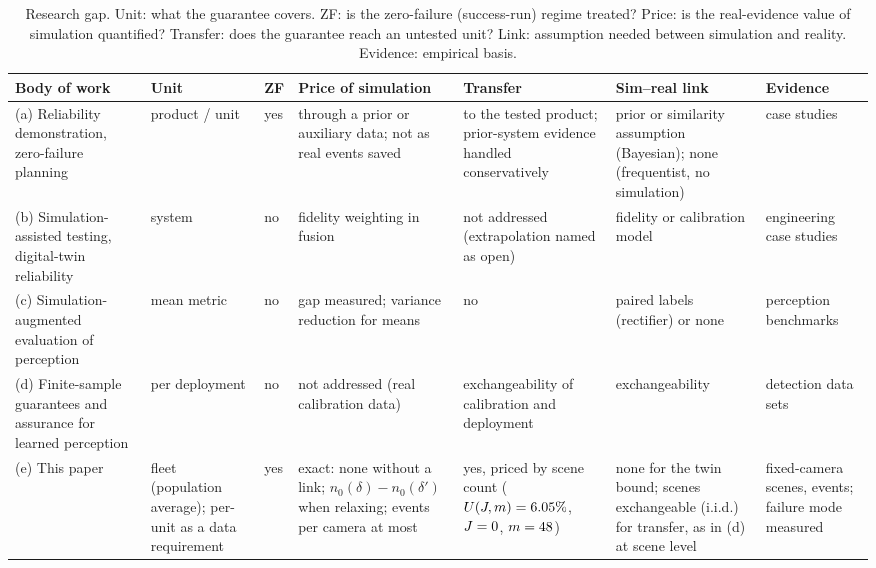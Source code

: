 \begin{table}[t]
\centering
\caption{Research gap. Unit: what the guarantee covers. ZF: is the zero-failure (success-run) regime treated? Price: is the
real-evidence value of simulation quantified? Transfer: does the guarantee reach an untested unit? Link: assumption needed
between simulation and reality. Evidence: empirical basis.}
\label{tab:gap}
\scriptsize
\setlength{\tabcolsep}{2pt}
\begin{tabular}{@{}L{0.18\textwidth}L{0.10\textwidth}L{0.05\textwidth}L{0.16\textwidth}L{0.15\textwidth}L{0.15\textwidth}L{0.13\textwidth}@{}}
\toprule
Body of work & Unit & ZF & Price of simulation & Transfer & Sim--real link & Evidence \\
\midrule
(a) Reliability demonstration, zero-failure planning~\cite{hanley1983,baze1979,wilson2021assurance,zheng2023gamma,ding2024truncated,wang2024monoprop,zhao2018perfection}
 & product / unit & yes & through a prior or auxiliary data; not as real events saved & to the tested product; prior-system evidence handled conservatively & prior or similarity assumption (Bayesian); none (frequentist, no simulation) & case studies \\
(b) Simulation-assisted testing, digital-twin reliability~\cite{tao2024subsea,ye2023structuraldt,wang2026fusion,li2026tugs,riedmaier2021vvuq}
 & system & no & fidelity weighting in fusion & not addressed (extrapolation named as open) & fidelity or calibration model & engineering case studies \\
(c) Simulation-augmented evaluation of perception~\cite{reway2020simgap,dieter2023drone,amini2024translators,zhao2025statfoundation,angelopoulos2023ppi,fisch2024stratppi}
 & mean metric & no & gap measured; variance reduction for means & no & paired labels (rectifier) or none & perception benchmarks \\
(d) Finite-sample guarantees and assurance for learned perception~\cite{angelopoulos2025ltt,degrancey2022conformaldet,mei2025pwc,yuan2026conformal,paterson2025amlas}
 & per deployment & no & not addressed (real calibration data) & exchangeability of calibration and deployment & exchangeability & detection data sets \\
(e) This paper & fleet (population average); per-unit as a data requirement & yes & exact: none without a link; $n_0(\delta)-n_0(\delta')$ when relaxing; \nSavedOP{} events per camera at most & yes, priced by scene count ($U(J,m)=6.05\%$, $J=0$, $m=48$) & none for the twin bound; scenes exchangeable (i.i.d.) for transfer, as in (d) at scene level & \nMainScenes{} fixed-camera scenes, \nMainN{} events; failure mode measured \\
\bottomrule
\end{tabular}
\end{table}
